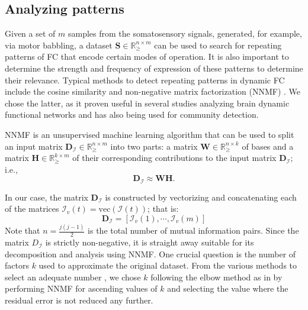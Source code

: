 \subsection{Analyzing patterns}
Given a set of $m$ samples from the somatosensory signals, generated, for example, via motor babbling, a dataset $\bm{S} \in \mathbb{R}^{n \times m}_{\geq}$ can be used to search for repeating patterns of FC that encode certain modes of operation. It is also important to determine the strength and frequency of expression of these patterns to determine their relevance. Typical methods to detect repeating patterns in dynamic FC include the cosine similarity \cite{Menon2019comparisonstaticdynamic} and  non-negative matrix factorization (NNMF) \cite{Fu2019Nonnegativematrixfactorization}. We chose the latter, as it proven useful in several studies analyzing brain dynamic functional networks and has also being used for community  detection\cite{Wang2011Communitydiscoveryusing,Luo2021Symmetricnonnegativematrix}.

NNMF is an unsupervised machine learning algorithm that can be used to split an input matrix $\bm{D}_{\bm{\mathcal{I}}} \in \mathbb{R}^{n\times m}_{\geq}$ into two parts: a matrix $\bm{W} \in \mathbb{R}^{n\times k}_{\geq}$ of bases and a matrix $\bm{H} \in \mathbb{R}^{k\times m}_{\geq}$ of their corresponding contributions to the input matrix $\bm{D}_{\bm{\mathcal{I}}}$; i.e.,
\begin{equation}
	\bm{D}_{\bm{\mathcal{I}}} 	\approx \bm{W} \bm{H}.
\end{equation}

In our case, the matrix $\bm{D}_{\bm{\mathcal{I}}}$ is constructed by vectorizing  and concatenating each of the matrices $\bm{\mathcal{I}}_v(t) = \text{vec}\left(\bm{\mathcal{I}}(t)\right)$; that is: 
\begin{equation}
	\bm{D}_{\bm{\mathcal{I}}} = [\bm{\mathcal{I}}_v(1),\cdots,\bm{\mathcal{I}}_v(m)]
\end{equation}
Note that $n = \frac{j(j-1)}{2}$ is the total number of mutual information pairs. Since the matrix $D_{\bm{\mathcal{I}}}$ is strictly non-negative, it is straight away suitable for its decomposition and analysis using NNMF. One crucial question is the number of factors $k$ used to approximate the original dataset. From the various methods to select an adequate number \cite{Muzzarelli2019RankSelectionNon}, we chose $k$ following the elbow method as in \cite{Phalen2020Nonnegativematrix} by performing NNMF for ascending values of $k$ and selecting the value where the residual error is not reduced any further.

